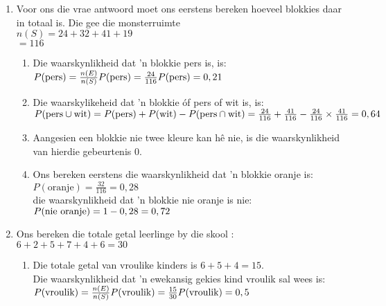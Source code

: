\begin{solutions}{}{
\begin{enumerate}[itemsep=5pt, label=\textbf{\arabic*}. ] 

\item %
    Voor ons die vrae antwoord moet ons eerstens bereken hoeveel blokkies daar in totaal is. Die gee die monsterruimte \\
    $n(S) = 24 + 32 + 41 + 19$\\
	 $= 116$
    \begin{enumerate}[noitemsep, label=\textbf{(\alph*)} ]

    \item Die waarskynlikheid dat 'n blokkie pers is, is:\\
    $P(\mbox{pers}) = \frac{n(E)}{n(S)}\\
     P(\mbox{pers}) = \frac{24}{116}\\
     P(\mbox{pers}) = 0,21$

    \item Die waarskylikeheid dat 'n blokkie óf pers of wit is, is:\\
    $P(\mbox{pers} \cup \mbox{wit}) = P(\mbox{pers}) + P(\mbox{wit}) - P(\mbox{pers} \cap \mbox{wit})\\
    = \frac{24}{116} + \frac{41}{116} - \frac{24}{116} \times \frac{41}{116}\\
    = 0,64$

    \item Aangesien een blokkie nie twee kleure kan hê nie, is die waarskynlikheid van hierdie gebeurtenis $0$.

    \item Ons bereken eerstens die waarskynlikheid dat 'n blokkie oranje is:\\
    $P(\mbox{oranje}) = \frac{32}{116}
	       = 0,28$\\
    die waarskynlikheid dat 'n blokkie nie oranje is nie:\\
    $P(\mbox{nie oranje}) = 1 - 0,28\\
		   = 0,72$
    \end{enumerate}
    
\item %
Ons bereken die totale getal leerlinge by die skool :\\
$6 + 2 + 5 + 7 + 4 + 6 = 30$
    \begin{enumerate}[noitemsep, label=\textbf{(\alph*)} ]
    \item Die totale getal van vroulike kinders is $6 + 5 + 4 = 15$.\\
    Die waarskynlikheid dat 'n  ewekansig gekies kind vroulik sal wees is:\\
    $P(\mbox{vroulik}) = \frac{n(E)}{n(S)}\\
     P(\mbox{vroulik}) = \frac{15}{30}\\
     P(\mbox{vroulik}) = 0,5$


\end{enumerate}
\end{enumerate}}
\end{solutions}
